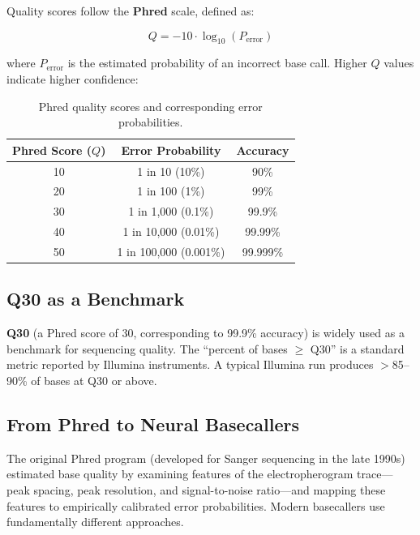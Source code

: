 Quality scores follow the \textbf{Phred} scale, defined as:

\begin{equation}
Q = -10 \cdot \log_{10}(P_{\text{error}})
\label{eq:seqprinciples:phred}
\end{equation}

where $P_{\text{error}}$ is the estimated probability of an incorrect base call. Higher $Q$ values indicate higher confidence:

\begin{table}[htbp]
\centering
\caption{Phred quality scores and corresponding error probabilities.}
\label{tab:seqprinciples:phred-scores}
\small
\begin{tabular}{ccc}
\toprule
\textbf{Phred Score ($Q$)} & \textbf{Error Probability} & \textbf{Accuracy} \\
\midrule
10 & 1 in 10 (10\%) & 90\% \\
20 & 1 in 100 (1\%) & 99\% \\
30 & 1 in 1,000 (0.1\%) & 99.9\% \\
40 & 1 in 10,000 (0.01\%) & 99.99\% \\
50 & 1 in 100,000 (0.001\%) & 99.999\% \\
\bottomrule
\end{tabular}
\end{table}

\subsection{Q30 as a Benchmark}
\label{subsec:seqprinciples:q30}

\textbf{Q30} (a Phred score of 30, corresponding to 99.9\% accuracy) is widely used as a benchmark for sequencing quality. The ``percent of bases $\geq$ Q30'' is a standard metric reported by Illumina instruments. A typical Illumina run produces $>$85--90\% of bases at Q30 or above.


\subsection{From Phred to Neural Basecallers}
\label{subsec:seqprinciples:basecaller-math}

The original Phred program (developed for Sanger sequencing in the late 1990s) estimated base quality by examining features of the electropherogram trace---peak spacing, peak resolution, and signal-to-noise ratio---and mapping these features to empirically calibrated error probabilities. Modern basecallers use fundamentally different approaches.

